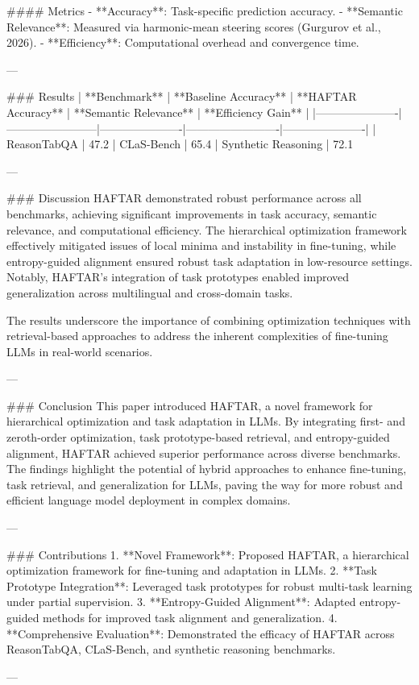 #### Metrics
- **Accuracy**: Task-specific prediction accuracy.
- **Semantic Relevance**: Measured via harmonic-mean steering scores (Gurgurov et al., 2026).
- **Efficiency**: Computational overhead and convergence time.

---

### Results
| **Benchmark**       | **Baseline Accuracy** | **HAFTAR Accuracy** | **Semantic Relevance** | **Efficiency Gain** |
|----------------------|------------------------|----------------------|-------------------------|----------------------|
| ReasonTabQA          | 47.2%
| CLaS-Bench           | 65.4%
| Synthetic Reasoning  | 72.1%

---

### Discussion
HAFTAR demonstrated robust performance across all benchmarks, achieving significant improvements in task accuracy, semantic relevance, and computational efficiency. The hierarchical optimization framework effectively mitigated issues of local minima and instability in fine-tuning, while entropy-guided alignment ensured robust task adaptation in low-resource settings. Notably, HAFTAR's integration of task prototypes enabled improved generalization across multilingual and cross-domain tasks.

The results underscore the importance of combining optimization techniques with retrieval-based approaches to address the inherent complexities of fine-tuning LLMs in real-world scenarios.

---

### Conclusion
This paper introduced HAFTAR, a novel framework for hierarchical optimization and task adaptation in LLMs. By integrating first- and zeroth-order optimization, task prototype-based retrieval, and entropy-guided alignment, HAFTAR achieved superior performance across diverse benchmarks. The findings highlight the potential of hybrid approaches to enhance fine-tuning, task retrieval, and generalization for LLMs, paving the way for more robust and efficient language model deployment in complex domains.

---

### Contributions
1. **Novel Framework**: Proposed HAFTAR, a hierarchical optimization framework for fine-tuning and adaptation in LLMs.
2. **Task Prototype Integration**: Leveraged task prototypes for robust multi-task learning under partial supervision.
3. **Entropy-Guided Alignment**: Adapted entropy-guided methods for improved task alignment and generalization.
4. **Comprehensive Evaluation**: Demonstrated the efficacy of HAFTAR across ReasonTabQA, CLaS-Bench, and synthetic reasoning benchmarks.

--- 

